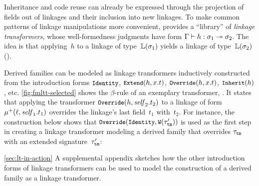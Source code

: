 
Inheritance and code reuse can already be expressed through the projection
of fields out of linkages and their inclusion into new linkages.
To make common patterns of linkage manipulations more convenient,
\TT provides a ``library'' of \emph{linkage transformers}, whose well-formedness judgments
have form $ {\Gamma} \vdash {h} : {\sigma_1} \twoheadrightarrow {\ensuremath{\sigma}_2}$. The idea is that
applying~$h$ to a linkage of type~$\mathbb{L}({\sigma_1})$ yields a linkage of
type~$\mathbb{L}({\sigma_2})$ ().

Derived families can be modeled as linkage transformers inductively
constructed from the introduction forms
$\small\texttt{Identity}$, $\small\texttt{Extend}({h},{x.t})$, $\small\texttt{Override}({h},{x.t})$, $\small\texttt{Inherit}({h})$, etc.
\cref{fig:fmltt-selected} shows the $\beta$-rule of an exemplary transformer,
.
It states that applying the transformer $\small\texttt{Override}({h},{\mathit{self}_2.t_2})$ to
a linkage of form $\mu^+({\ell},{\mathit{self}_1.t_1})$
overrides the linkage's last field~$t_1$ with~$t_2$.
For instance, the construction below shows that 
$\small\texttt{Override}({\texttt{Identity}},{\texttt{W}({\tau'_{\texttt{tm}}})})$
is used as the first step in creating a linkage transformer modeling a derived family that
overrides $\tau_{\texttt{tm}}$ with an extended
signature~$\tau'_{\texttt{tm}}$:
\vspace{.9ex}

\noindent


\noindent
\ifreport \cref{sec:lt-in-action}
\else A supplemental appendix
\fi
sketches how the other introduction forms of linkage transformers
can be used to model the construction of a derived family as a linkage transformer.



